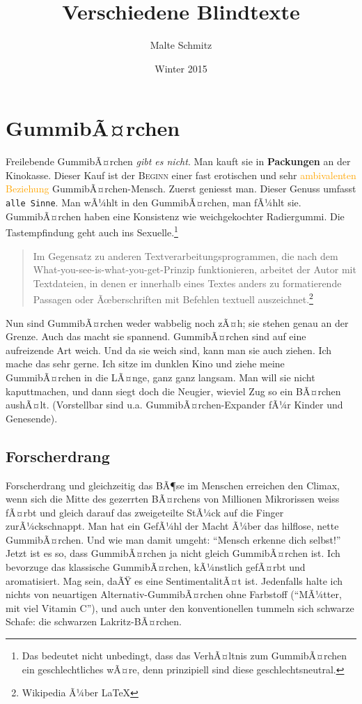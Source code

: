 \documentclass{scrartcl}
\begin{document}
  \title{Verschiedene Blindtexte}
  \author{Malte Schmitz}
  \date{Winter 2015}
  \maketitle

  \tableofcontents

  \section{GummibÃ¤rchen}

  Freilebende GummibÃ¤rchen \emph{gibt es nicht}. Man kauft sie in \textbf{Packungen} an der Kinokasse. Dieser Kauf ist der \textsc{Beginn} einer fast erotischen und sehr \textcolor{orange}{ambivalenten Beziehung} GummibÃ¤rchen-Mensch. Zuerst geniesst man. Dieser Genuss umfasst \texttt{alle Sinne}. Man wÃ¼hlt in den GummibÃ¤rchen, man fÃ¼hlt sie. GummibÃ¤rchen haben eine Konsistenz wie weichgekochter Radiergummi. Die Tastempfindung geht auch ins Sexuelle.\footnote{Das bedeutet nicht unbedingt, dass das VerhÃ¤ltnis zum GummibÃ¤rchen ein geschlechtliches wÃ¤re, denn prinzipiell sind diese geschlechtsneutral.}

  \begin{quote}
    Im Gegensatz zu anderen Textverarbeitungsprogrammen, die nach dem What-you-see-is-what-you-get-Prinzip funktionieren, arbeitet der Autor mit Textdateien, in denen er innerhalb eines Textes anders zu formatierende Passagen oder Ãœberschriften mit Befehlen textuell auszeichnet.\footnote{Wikipedia Ã¼ber LaTeX}
  \end{quote}

  Nun sind GummibÃ¤rchen weder wabbelig noch zÃ¤h; sie stehen genau an der Grenze. Auch das macht sie spannend. GummibÃ¤rchen sind auf eine aufreizende Art weich. Und da sie weich sind, kann man sie auch ziehen. Ich mache das sehr gerne. Ich sitze im dunklen Kino und ziehe meine GummibÃ¤rchen in die LÃ¤nge, ganz ganz langsam. Man will sie nicht kaputtmachen, und dann siegt doch die Neugier, wieviel Zug so ein BÃ¤rchen aushÃ¤lt. (Vorstellbar sind u.a. GummibÃ¤rchen-Expander fÃ¼r Kinder und Genesende).

  \subsection{Forscherdrang}

  Forscherdrang und gleichzeitig das BÃ¶se im Menschen erreichen den Climax, wenn sich die Mitte des gezerrten BÃ¤rchens von Millionen Mikrorissen weiss fÃ¤rbt und gleich darauf das zweigeteilte StÃ¼ck auf die Finger zurÃ¼ckschnappt. Man hat ein GefÃ¼hl der Macht Ã¼ber das hilflose, nette GummibÃ¤rchen. Und wie man damit umgeht: \enquote{Mensch erkenne dich selbst!} Jetzt ist es so, dass GummibÃ¤rchen ja nicht gleich GummibÃ¤rchen ist. Ich bevorzuge das klassische GummibÃ¤rchen, kÃ¼nstlich gefÃ¤rbt und aromatisiert. Mag sein, daÃŸ es eine SentimentalitÃ¤t ist. Jedenfalls halte ich nichts von neuartigen Alternativ-GummibÃ¤rchen ohne Farbstoff (\enquote{MÃ¼tter, mit viel Vitamin C}), und auch unter den konventionellen tummeln sich schwarze Schafe: die schwarzen Lakritz-BÃ¤rchen.
\end{document}
